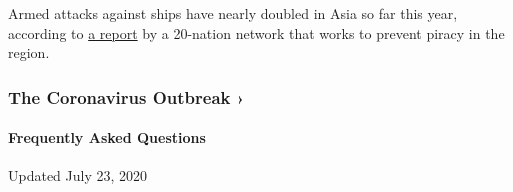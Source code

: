 Armed attacks against ships have nearly doubled in Asia so far this
year, according to
\href{https://www.recaap.org/resources/ck/files/reports/half-year/ReCAAP\%20ISC\%20Half\%20Yearly\%20Report\%202020.pdf}{a
report} by a 20-nation network that works to prevent piracy in the
region.

\href{https://www.nytimes3xbfgragh.onion/news-event/coronavirus?action=click\&pgtype=Article\&state=default\&module=styln-coronavirus-national\&region=MAIN_CONTENT_3\&context=storylines_faq}{}

\hypertarget{the-coronavirus-outbreak-}{%
\subsubsection{The Coronavirus Outbreak
›}\label{the-coronavirus-outbreak-}}

\hypertarget{frequently-asked-questions}{%
\paragraph{Frequently Asked
Questions}\label{frequently-asked-questions}}

Updated July 23, 2020

